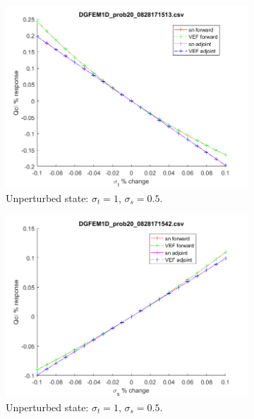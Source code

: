 \documentclass[12pt]{report}
\newcommand{\sigt}{\sigma_t}
\newcommand{\sigs}{\sigma_s}
\begin{document}
\begin{figure}[H]
\begin{subfigure}{.5\textwidth}
  \includegraphics[width=.98\linewidth]{figures/20sigtSens.png}
  \caption{Unperturbed state: $\sigt=1$, $\sigs=0.5$.}
  \label{fig:sfig2}
\end{subfigure}%
\begin{subfigure}{.5\textwidth}
  \centering
  \includegraphics[width=.98\linewidth]{figures/20sigsSens.png}
  \caption{Unperturbed state: $\sigt=1$, $\sigs=0.5$.}
  \label{fig:sfig5}
\end{subfigure}%
\\
\begin{subfigure}{.5\textwidth}
  \centering

\end{subfigure}
\end{figure}
\end{document}
